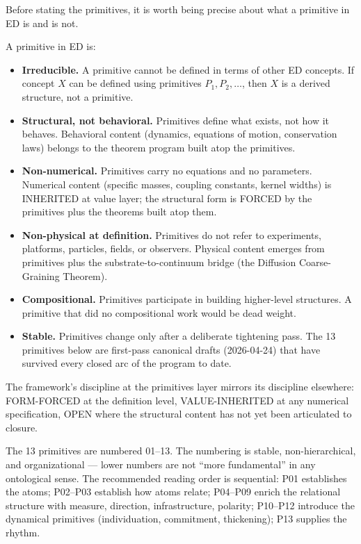 \documentclass[11pt,a4paper]{article}
\begin{document}
Before stating the primitives, it is worth being precise about what a primitive in ED is and is not.

A primitive in ED is:

\begin{itemize}[noitemsep]
\item \textbf{Irreducible.} A primitive cannot be defined in terms of other ED concepts. If concept $X$ can be defined using primitives $P_1, P_2, \ldots$, then $X$ is a derived structure, not a primitive.
\item \textbf{Structural, not behavioral.} Primitives define what exists, not how it behaves. Behavioral content (dynamics, equations of motion, conservation laws) belongs to the theorem program built atop the primitives.
\item \textbf{Non-numerical.} Primitives carry no equations and no parameters. Numerical content (specific masses, coupling constants, kernel widths) is INHERITED at value layer; the structural form is FORCED by the primitives plus the theorems built atop them.
\item \textbf{Non-physical at definition.} Primitives do not refer to experiments, platforms, particles, fields, or observers. Physical content emerges from primitives plus the substrate-to-continuum bridge (the Diffusion Coarse-Graining Theorem).
\item \textbf{Compositional.} Primitives participate in building higher-level structures. A primitive that did no compositional work would be dead weight.
\item \textbf{Stable.} Primitives change only after a deliberate tightening pass. The 13 primitives below are first-pass canonical drafts (2026-04-24) that have survived every closed arc of the program to date.
\end{itemize}

The framework's discipline at the primitives layer mirrors its discipline elsewhere: FORM-FORCED at the definition level, VALUE-INHERITED at any numerical specification, OPEN where the structural content has not yet been articulated to closure.

The 13 primitives are numbered 01--13. The numbering is stable, non-hierarchical, and organizational --- lower numbers are not ``more fundamental'' in any ontological sense. The recommended reading order is sequential: P01 establishes the atoms; P02--P03 establish how atoms relate; P04--P09 enrich the relational structure with measure, direction, infrastructure, polarity; P10--P12 introduce the dynamical primitives (individuation, commitment, thickening); P13 supplies the rhythm.
\end{document}
